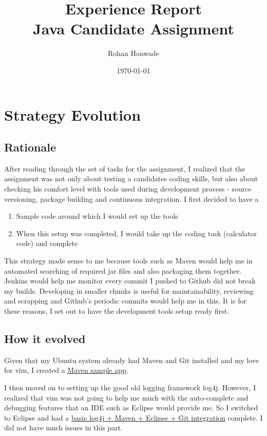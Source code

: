 \documentclass[12pt]{article}
\title{Experience Report \\ Java Candidate Assignment}
\author{Rohan Honwade}
\date{\today}
\begin{document}
\maketitle

\section{Strategy Evolution}

\subsection{Rationale}
After reading through the set of tasks for the assignment, I realized that the assignment was not only about testing a candidates coding skills, but also about checking his comfort level with tools used during development process - source versioning, package building and continuous integration. I first decided to have a 
\begin{enumerate}
\item Sample code around which I would set up the tools 
\item When this setup was completed, I would take up the coding task (calculator code) and complete
\end{enumerate}
This strategy made sense to me because tools such as Maven would help me in automated searching of required jar files and also packaging them together. Jenkins would help me monitor every commit I pushed to Github did not break my builds. Developing in smaller chunks is useful for maintainability, reviewing and scrapping and Github's periodic commits would help me in this. It is for these reasons, I set out to have the development tools setup ready first. 

\subsection{How it evolved}
Given that my Ubuntu system already had Maven and Git installed and my love for vim, I created a \href{https://github.com/rhcode/simple-calculator/commit/3f0fe3f229b202f47a1527f101264630f0fa4612}{Maven sample app}. 

I then moved on to setting up the good old logging framework log4j. However, I realized that vim was not going to help me much with the auto-complete and debugging features that an IDE such as Eclipse would provide me. So I switched to Eclipse and had a \href{https://github.com/rhcode/simple-calculator/commit/1af83f8bd9457dae511ee035b72e6ecaacacf724}{basic log4j + Maven + Eclipse + Git integration} complete. I did not have much issues in this part.
\end{document}
